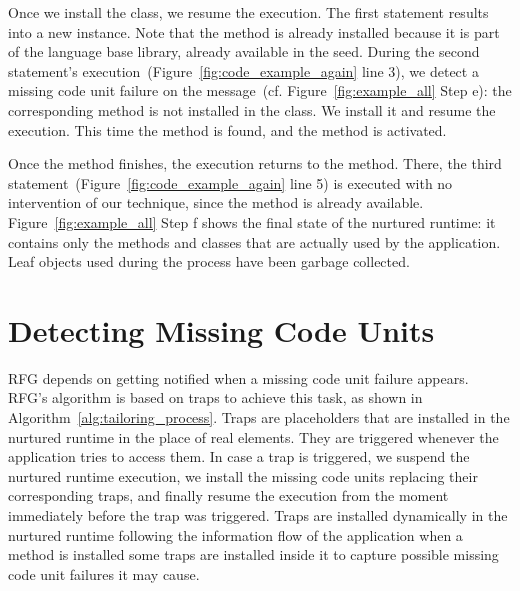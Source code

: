 Once we install the  class, we resume the execution. The first statement results into a new  instance. Note that the  method is already installed because it is part of the language base library, already available in the seed. 
During the second statement's execution~(Figure~\ref{fig:code_example_again} line 3), we detect a missing code unit failure on the  message~(cf. Figure~\ref{fig:example_all} Step e): the corresponding method is not installed in the  class. We install it and resume the execution. This time the method is found, and the  method is activated.



Once the  method finishes, the execution returns to the  method. There, the third statement~(Figure~\ref{fig:code_example_again} line 5) is executed with no intervention of our technique, since the  method is already available. Figure~\ref{fig:example_all} Step f shows the final state of the nurtured runtime: it contains only the methods and classes that are actually used by the application. Leaf objects used during the process have been garbage collected.


\section{Detecting Missing Code Units}\label{sec:model_detail}

RFG depends on getting notified when a missing code unit failure appears. RFG's algorithm is based on traps to achieve this task, as shown in Algorithm~\ref{alg:tailoring_process}. Traps are placeholders that are installed in the nurtured runtime in the place of real elements. They are triggered whenever the application tries to access them. In case a trap is triggered, we suspend the nurtured runtime execution, we install the missing code units replacing their corresponding traps, and finally resume the execution from the moment immediately before the trap was triggered. Traps are installed dynamically in the nurtured runtime following the information flow of the application \eg when a method  is installed some traps are installed inside it to capture possible missing code unit failures it may cause.

